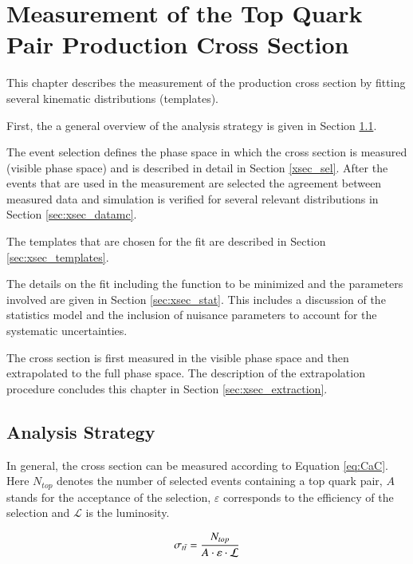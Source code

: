 \chapter{Measurement of the Top Quark Pair Production Cross Section}
\label{sec:xsec}

This chapter describes the measurement of the \ttbar production cross section by fitting several kinematic distributions (templates). 

First, the a general overview of the analysis strategy is given in Section \ref{sec:xsec_strat}.

The event selection defines the phase space in which the \ttbar cross section is measured (visible phase space) and is described in detail in Section \ref{xsec_sel}.
After the events that are used in the measurement are selected the agreement between measured data and simulation is verified for several relevant distributions in Section \ref{sec:xsec_datamc}.

The templates that are chosen for the fit are described in Section \ref{sec:xsec_templates}.

The details on the fit including the function to be minimized and the parameters involved are given in Section \ref{sec:xsec_stat}.
This includes a discussion of the statistics model and the inclusion of nuisance parameters to account for the systematic uncertainties.

The cross section is first measured in the visible phase space and then extrapolated to the full phase space. The description of the extrapolation procedure concludes this chapter in Section \ref{sec:xsec_extraction}.

\section{Analysis Strategy}
\label{sec:xsec_strat}

In general, the cross section can be measured according to Equation \ref{eq:CaC}. Here $N_{top}$ denotes the number of selected events containing a top quark pair, $A$ stands for the acceptance of the selection,
$\varepsilon$ corresponds to the efficiency of the selection and $\mathcal{L}$ is the luminosity.


\begin{equation}
\sigma_{t\bar{t}} = \frac{N_{top}}{A \cdot \varepsilon \cdot \mathcal{L}}
\label{eq:CaC}
\end{equation} 


